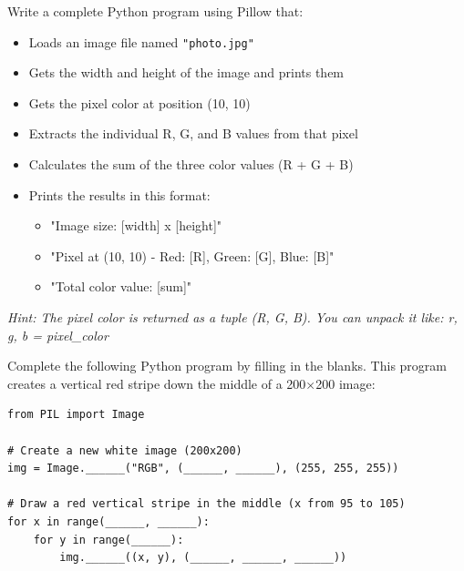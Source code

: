 \documentclass{csexam}
\begin{document}
\begin{questions}

\newpage

\question[15] Write a complete Python program using Pillow that:
\begin{itemize}
    \item Loads an image file named \texttt{"photo.jpg"}
    \item Gets the width and height of the image and prints them
    \item Gets the pixel color at position (10, 10)
    \item Extracts the individual R, G, and B values from that pixel
    \item Calculates the sum of the three color values (R + G + B)
    \item Prints the results in this format:
    \begin{itemize}
        \item "Image size: [width] x [height]"
        \item "Pixel at (10, 10) - Red: [R], Green: [G], Blue: [B]"
        \item "Total color value: [sum]"
    \end{itemize}
\end{itemize}

\textit{Hint: The pixel color is returned as a tuple (R, G, B). You can unpack it like: r, g, b = pixel\_color}

\vspace{10cm}

\newpage

\question[12] Complete the following Python program by filling in the blanks. This program creates a vertical red stripe down the middle of a 200×200 image:

\begin{lstlisting}
from PIL import Image

# Create a new white image (200x200)
img = Image.______("RGB", (______, ______), (255, 255, 255))

# Draw a red vertical stripe in the middle (x from 95 to 105)
for x in range(______, ______):
    for y in range(______):
        img.______((x, y), (______, ______, ______))


\end{lstlisting}
\end{questions}
\end{document}
